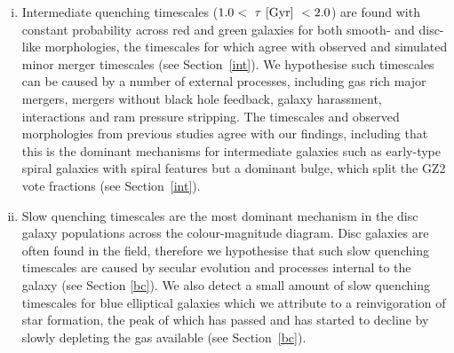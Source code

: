 \begin{enumerate}[(i)]
\item Intermediate quenching timescales ($1.0 < ~\tau~\rm{[Gyr]}~ < 2.0 $) are found with constant probability across red and green galaxies for both smooth- and disc-like morphologies, the timescales for which agree with observed and simulated minor merger timescales (see Section~\ref{int}). We hypothesise such timescales can be caused by a number of external processes, including gas rich major mergers, mergers without black hole feedback, galaxy harassment, interactions and ram pressure stripping. The timescales and observed morphologies from previous studies agree with our findings, including that this is the dominant mechanisms for intermediate galaxies such as early-type spiral galaxies with spiral features but a dominant bulge, which split the GZ2 vote fractions (see Section~\ref{int}). 

\item Slow quenching timescales are the most dominant mechanism in the disc galaxy populations across the colour-magnitude diagram. Disc galaxies are often found in the field, therefore we hypothesise that such slow quenching timescales are caused by secular evolution and processes internal to the galaxy (see Section \ref{bc}). We also detect a small amount of slow quenching timescales for blue elliptical galaxies which we attribute to a reinvigoration of star formation, the peak of which has passed and has started to decline by slowly depleting the gas available (see Section~\ref{bc}). 
\end{enumerate}
